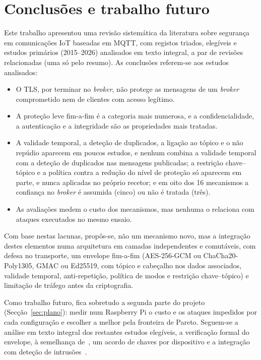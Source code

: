 \section{Conclusões e trabalho futuro}
\label{sec:conclusoes}

Este trabalho apresentou uma revisão sistemática da literatura sobre segurança em
comunicações IoT baseadas em MQTT, com \nTriados{} registos triados, \nElegiveis{}
elegíveis e \nIncluidos{} estudos primários (2015--2026)
analisados em texto integral, a par de \nSecundarios{} revisões relacionadas (uma só
pelo resumo). As conclusões referem-se aos estudos analisados:

\begin{itemize}[leftmargin=*]
  \item O TLS, por terminar no \emph{broker}, não protege as mensagens de um
    \emph{broker} comprometido nem de clientes com acesso legítimo.
  \item A proteção leve fim-a-fim é a categoria mais numerosa, e a
    confidencialidade, a autenticação e a integridade são as propriedades mais
    tratadas.
  \item A validade temporal, a deteção de duplicados, a ligação ao tópico e o não
    repúdio aparecem em poucos estudos, e nenhum combina a validade temporal com a
    deteção de duplicados nas mensagens publicadas; a restrição chave--tópico e a
    política contra a redução do nível de proteção só aparecem em parte, e nunca
    aplicadas no próprio recetor; e em oito dos 16 mecanismos a confiança no
    \emph{broker} é assumida (cinco) ou não é tratada (três).
  \item As avaliações medem o custo dos mecanismos, mas nenhuma o relaciona com
    ataques executados no mesmo ensaio.
\end{itemize}

Com base nestas lacunas, propôs-se, não um mecanismo novo, mas a integração destes
elementos numa arquitetura em camadas independentes e
comutáveis, com defesa no transporte, um envelope fim-a-fim (AES-256-GCM ou ChaCha20-Poly1305, GMAC ou
Ed25519, com tópico e cabeçalho nos dados associados, validade temporal,
anti-repetição, política de modos e restrição chave--tópico) e limitação de
tráfego antes da criptografia.

Como trabalho futuro, fica sobretudo a segunda parte do projeto
(Secção~\ref{sec:plano}): medir num Raspberry Pi o custo e os ataques impedidos por
cada configuração e escolher a melhor pela fronteira de Pareto. Seguem-se a
análise em texto integral dos restantes estudos elegíveis, a verificação formal do
envelope, à semelhança de~\cite{javadi2026cmap}, um acordo de
chaves por dispositivo e a integração com deteção de
intrusões~\cite{vaccari2020mqttset, alotaibi2024secure}.
